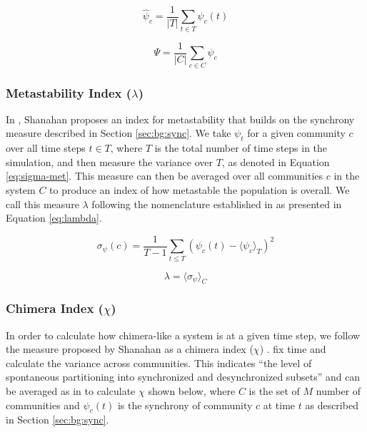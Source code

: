 \documentclass[a4paper,11pt]{article}
\begin{document}
\begin{equation} \label{eq:comm-sync}
\widehat{\psi}_c = \frac{1}{|T|} \sum_{t \in T} \psi_c(t)
\end{equation}

\begin{equation} \label{eq:global-sync}
\Psi = \frac{1}{|C|} \sum_{c \in C} \widehat{\psi}_c
\end{equation}
 
\subsubsection{Metastability Index ($\lambda$)}
\label{sec:bg:lambda}

In \cite{Shanahan2010}, Shanahan proposes an index for metastability that builds on the synchrony measure described in Section \ref{sec:bg:sync}. We take $\psi_t$ for a given community $c$ over all time steps $t \in T$, where $T$ is the total number of time steps in the simulation, and then measure the variance over $T$, as denoted in Equation \ref{eq:sigma-met}. This measure can then be averaged over all communities $c$ in the system $C$ to produce an index of how metastable the population is overall. We call this measure $\lambda$ following the nomenclature established in \cite{Shanahan2010} as presented in Equation \ref{eq:lambda}.

\begin{equation} \label{eq:sigma-met}
\sigma_{\psi}(c) = \frac{1}{T - 1} \sum_{t \leq T }(\psi_{c}(t) - \langle \psi_{c}\rangle_T)^2
\end{equation}

\begin{equation} \label{eq:lambda}
\lambda = \langle \sigma_{\psi} \rangle_C
\end{equation}

\subsubsection{Chimera Index ($\chi$)}
\label{sec:bg:chi}

In order to calculate how chimera-like a system is at a given time step, we follow the measure proposed by Shanahan as a chimera index ($\chi$) \cite{Shanahan2010}.  fix time and calculate the variance across communities. This indicates ``the level of spontaneous partitioning into synchronized and desynchronized subsets'' \cite{Bhowmik2013} and can be averaged as in \cite{Shanahan2010} to calculate $\chi$ shown below, where $C$ is the set of $M$ number of communities and $\psi_c(t)$ is the synchrony of community $c$ at time $t$ as described in Section \ref{sec:bg:sync}.
\end{document}
